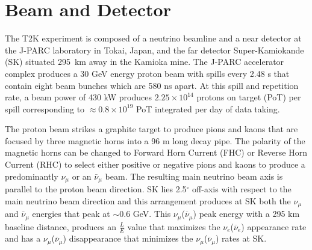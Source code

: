 \section{Beam and Detector}

The T2K experiment \citep{t2k-expt} is composed of a neutrino beamline
and a near detector at the J-PARC laboratory in Tokai, Japan, and
the far detector Super-Kamiokande (SK) situated \mbox{295 km} away in the Kamioka mine. 
The J-PARC accelerator complex produces a 30 GeV energy proton beam with spills
every 2.48 s that contain eight beam bunches which are 580 ns apart.
At this spill and repetition rate, 
a beam power of 430 kW
produces $2.25\times 10^{14}$ protons on target (PoT) per spill
corresponding to $\approx 0.8\times 10^{19}$ PoT integrated 
per day of data taking.

The proton beam
strikes a graphite target to produce pions and kaons that are focused
by three magnetic horns into a 96 m long decay pipe. The polarity of the magnetic horns
can be changed to Forward Horn Current (FHC) or Reverse
Horn Current (RHC) to select either positive or negative pions and
kaons to produce a predominantly $\nu_\mu$ or an $\bar\nu_\mu$ beam.
%
%
The resulting main neutrino beam axis is parallel to the proton beam direction. 
SK lies 2.5$^\circ$ off-axis with respect to the
main neutrino beam direction and this arrangement produces at SK both
the $\nu_\mu$ and $\bar\nu_\mu$ energies that peak at $\sim$0.6 GeV.
This $\nu_\mu$($\overline\nu_\mu$) peak energy with a 295 km baseline distance,
produces an $\frac{L}{E}$ value that maximizes the $\nu_{e}$($\overline{\nu}_{e}$)
appearance rate and has a $\nu_{\mu}$($\overline{\nu}_{\mu}$) disappearance
that minimizes the $\nu_\mu$($\overline\nu_\mu$) rates at SK.

